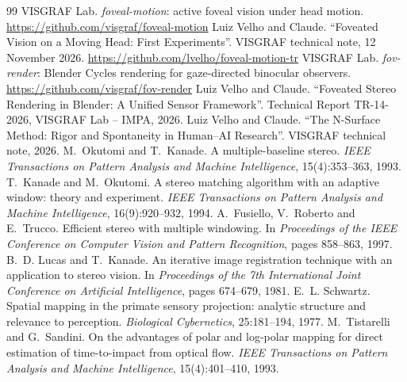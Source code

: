 \documentclass[11pt,a4paper]{article}
\begin{document}
\begin{thebibliography}{99}
 VISGRAF Lab. \emph{foveal-motion}: active foveal vision under head motion.
  \url{https://github.com/visgraf/foveal-motion}
 Luiz Velho and Claude. ``Foveated Vision on a Moving Head: First Experiments''. VISGRAF technical note,
  12 November 2026. \url{https://github.com/lvelho/foveal-motion-tr}
 VISGRAF Lab. \emph{fov-render}: Blender Cycles rendering for gaze-directed binocular observers.
  \url{https://github.com/visgraf/fov-render}
 Luiz Velho and Claude. ``Foveated Stereo Rendering in Blender: A Unified Sensor Framework''.
  Technical Report TR-14-2026, VISGRAF Lab -- IMPA, 2026.
 Luiz Velho and Claude. ``The N-Surface Method: Rigor and Spontaneity in Human--AI Research''.
  VISGRAF technical note, 2026.
 M.~Okutomi and T.~Kanade. A multiple-baseline stereo. \emph{IEEE Transactions on Pattern Analysis and
  Machine Intelligence}, 15(4):353--363, 1993.
 T.~Kanade and M.~Okutomi. A stereo matching algorithm with an adaptive window: theory and
  experiment. \emph{IEEE Transactions on Pattern Analysis and Machine Intelligence}, 16(9):920--932, 1994.
 A.~Fusiello, V.~Roberto and E.~Trucco. Efficient stereo with multiple windowing. In \emph{Proceedings
  of the IEEE Conference on Computer Vision and Pattern Recognition}, pages 858--863, 1997.
 B.~D. Lucas and T.~Kanade. An iterative image registration technique with an application to stereo
  vision. In \emph{Proceedings of the 7th International Joint Conference on Artificial Intelligence}, pages 674--679, 1981.
 E.~L. Schwartz. Spatial mapping in the primate sensory projection: analytic structure and relevance
  to perception. \emph{Biological Cybernetics}, 25:181--194, 1977.
 M.~Tistarelli and G.~Sandini. On the advantages of polar and log-polar mapping for direct estimation
  of time-to-impact from optical flow. \emph{IEEE Transactions on Pattern Analysis and Machine Intelligence},
  15(4):401--410, 1993.
\end{thebibliography}
\end{document}
